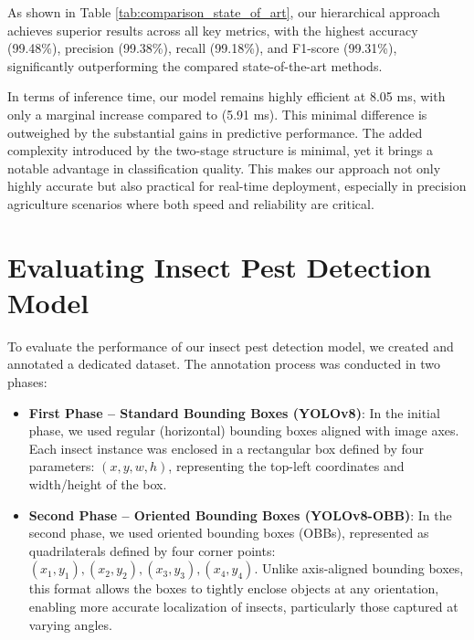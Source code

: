 As shown in Table \ref{tab:comparison_state_of_art}, our hierarchical approach achieves superior results across all key metrics, with the highest accuracy (99.48\%), precision (99.38\%), recall (99.18\%), and F1-score (99.31\%), significantly outperforming the compared state-of-the-art methods.

In terms of inference time, our model remains highly efficient at 8.05 ms, with only a marginal increase compared to \textcite{jouini2024wheat} (5.91 ms). This minimal difference is outweighed by the substantial gains in predictive performance. The added complexity introduced by the two-stage structure is minimal, yet it brings a notable advantage in classification quality. This makes our approach not only highly accurate but also practical for real-time deployment, especially in precision agriculture scenarios where both speed and reliability are critical.





\section{Evaluating Insect Pest Detection Model}
\label{sec:Pesttest}
To evaluate the performance of our insect pest detection model, we created and annotated a dedicated dataset. The annotation process was conducted in two phases:

\begin{itemize}
    \item \textbf{First Phase – Standard Bounding Boxes (YOLOv8)}: In the initial phase, we used regular (horizontal) bounding boxes aligned with image axes. Each insect instance was enclosed in a rectangular box defined by four parameters: $(x, y, w, h)$, representing the top-left coordinates and width/height of the box.
    
    \item \textbf{Second Phase – Oriented Bounding Boxes (YOLOv8-OBB)}: In the second phase, we used oriented bounding boxes (OBBs), represented as quadrilaterals defined by four corner points: $(x_1, y_1), (x_2, y_2), (x_3, y_3), (x_4, y_4)$. Unlike axis-aligned bounding boxes, this format allows the boxes to tightly enclose objects at any orientation, enabling more accurate localization of insects, particularly those captured at varying angles.
\end{itemize}

